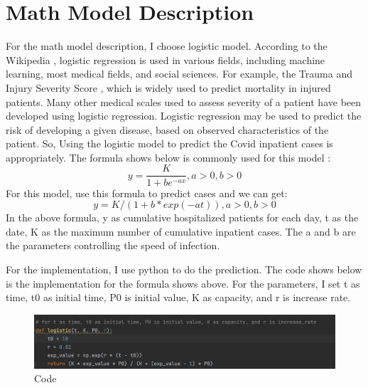 \documentclass[12pt]{article}
\begin{document}
	\section{Math Model Description}
	For the math model description, I choose logistic model. According to the Wikipedia \cite{5}, logistic regression is used in various fields, including machine learning, most medical fields, and social sciences. For example, the Trauma and Injury Severity Score , which is widely used to predict mortality in injured patients. Many other medical scales used to assess severity of a patient have been developed using logistic regression. Logistic regression may be used to predict the risk of developing a given disease, based on observed characteristics of the patient. So, Using the logistic model to predict the Covid inpatient cases is appropriately. The formula shows below is commonly used for this model \cite{6}:
	\[ y=\frac{K}{1+be^{-ax} } ,a>0,b>0\]
	\noindent
	For this model, use this formula to predict cases and we can get:
	\[ y=K/(1+b*exp(-at)),a>0,b>0\]
	\noindent
	In the above formula, y as cumulative hospitalized patients for each day, t as the date, K as the maximum number of cumulative inpatient cases. The a and b are the parameters controlling the speed of infection.
	
	For the implementation, I use python to do the prediction. The code shows below is the implementation for the formula shows above. For the parameters, I set t as time, t0 as initial time, P0 is initial value, K as capacity, and r is increase rate.
	\begin{figure}[h]
		\centering
		\includegraphics[width=1\textwidth]{Figure1.png}
		\caption{Code}
	\end{figure}
	
\end{document}

